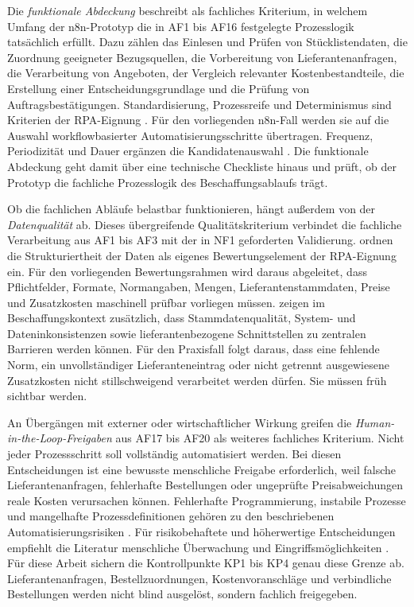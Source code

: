 \documentclass[a4paper,12pt]{article}
\begin{document}
Die \textit{funktionale Abdeckung} beschreibt als fachliches Kriterium, in welchem Umfang der n8n-Prototyp die in AF1 bis AF16 festgelegte Prozesslogik tatsächlich erfüllt. Dazu zählen das Einlesen und Prüfen von Stücklistendaten, die Zuordnung geeigneter Bezugsquellen, die Vorbereitung von Lieferantenanfragen, die Verarbeitung von Angeboten, der Vergleich relevanter Kostenbestandteile, die Erstellung einer Entscheidungsgrundlage und die Prüfung von Auftragsbestätigungen. Standardisierung, Prozessreife und Determinismus sind Kriterien der RPA-Eignung \parencite{wellmann_framework_2020}. Für den vorliegenden n8n-Fall werden sie auf die Auswahl workflowbasierter Automatisierungsschritte übertragen. Frequenz, Periodizität und Dauer ergänzen die Kandidatenauswahl \parencite{choi_candidate_2021}. Die funktionale Abdeckung geht damit über eine technische Checkliste hinaus und prüft, ob der Prototyp die fachliche Prozesslogik des Beschaffungsablaufs trägt.

Ob die fachlichen Abläufe belastbar funktionieren, hängt außerdem von der \textit{Datenqualität} ab. Dieses übergreifende Qualitätskriterium verbindet die fachliche Verarbeitung aus AF1 bis AF3 mit der in NF1 geforderten Validierung. \Textcite{wellmann_framework_2020} ordnen die Strukturiertheit der Daten als eigenes Bewertungselement der RPA-Eignung ein. Für den vorliegenden Bewertungsrahmen wird daraus abgeleitet, dass Pflichtfelder, Formate, Normangaben, Mengen, Lieferantenstammdaten, Preise und Zusatzkosten maschinell prüfbar vorliegen müssen. \Textcite{flechsig_robotic_2022} zeigen im Beschaffungskontext zusätzlich, dass Stammdatenqualität, System- und Dateninkonsistenzen sowie lieferantenbezogene Schnittstellen zu zentralen Barrieren werden können. Für den Praxisfall folgt daraus, dass eine fehlende Norm, ein unvollständiger Lieferanteneintrag oder nicht getrennt ausgewiesene Zusatzkosten nicht stillschweigend verarbeitet werden dürfen. Sie müssen früh sichtbar werden.

An Übergängen mit externer oder wirtschaftlicher Wirkung greifen die \textit{Human-in-the-Loop-Freigaben} aus AF17 bis AF20 als weiteres fachliches Kriterium. Nicht jeder Prozessschritt soll vollständig automatisiert werden. Bei diesen Entscheidungen ist eine bewusste menschliche Freigabe erforderlich, weil falsche Lieferantenanfragen, fehlerhafte Bestellungen oder ungeprüfte Preisabweichungen reale Kosten verursachen können. Fehlerhafte Programmierung, instabile Prozesse und mangelhafte Prozessdefinitionen gehören zu den beschriebenen Automatisierungsrisiken \parencite{brettschneider_bewertung_2020}. Für risikobehaftete und höherwertige Entscheidungen empfiehlt die Literatur menschliche Überwachung und Eingriffsmöglichkeiten \parencite{ng_systematic_2021}. Für diese Arbeit sichern die Kontrollpunkte KP1 bis KP4 genau diese Grenze ab. Lieferantenanfragen, Bestellzuordnungen, Kostenvoranschläge und verbindliche Bestellungen werden nicht blind ausgelöst, sondern fachlich freigegeben.
\end{document}
